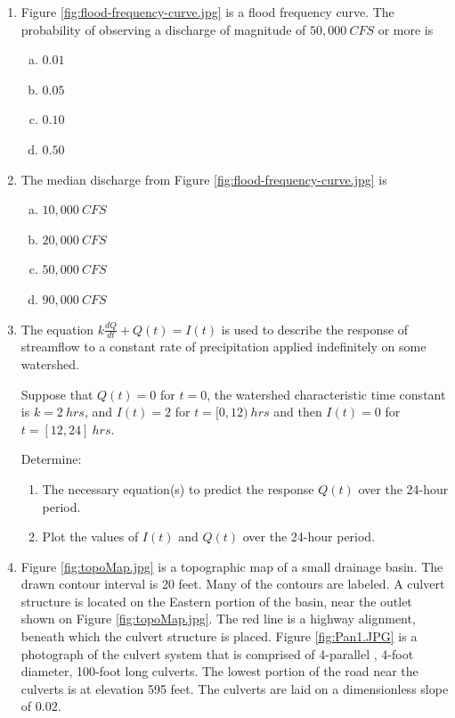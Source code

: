 \documentclass[12pt]{article}
\begin{document}
\begin{enumerate}
\item Figure \ref{fig:flood-frequency-curve.jpg} is a flood frequency curve.   The probability of observing a discharge of magnitude of $50,000~CFS$ or more is
\begin{enumerate}[(a)]
\item $0.01$
\item $0.05$
\item $0.10$
\item $0.50$
\end{enumerate}

\item The median discharge from Figure \ref{fig:flood-frequency-curve.jpg} is
\begin{enumerate}[(a)]
\item $10,000~CFS$
\item $20,000~CFS$
\item $50,000~CFS$
\item $90,000~CFS$
\end{enumerate}

\clearpage

\item The equation $k\frac{dQ}{dt} + Q(t) = I(t)$ is used to describe the response of streamflow to a constant rate of precipitation applied indefinitely on some watershed.  

Suppose that $Q(t)=0$ for $t=0$, the watershed characteristic time constant is $k=2~hrs$, and $I(t) =2$ for $t=[0,12)~hrs$ and then $I(t) =0$ for $t=[12,24]~hrs$. 

Determine:
\begin{enumerate}
\item The necessary equation(s) to predict the response $Q(t)$ over the 24-hour period.
\item Plot the values of $I(t)$ and $Q(t)$ over the 24-hour period.
\end{enumerate}
\clearpage

\item  Figure \ref{fig:topoMap.jpg} is a  topographic map of a small drainage basin.  The drawn contour interval is 20 feet.  Many of the contours are labeled.   A culvert structure is located on the Eastern portion of the basin, near the outlet shown on Figure \ref{fig:topoMap.jpg}.   The red line is a highway alignment, beneath which the culvert structure is placed.  Figure \ref{fig:Pan1.JPG} is a photograph of the culvert system that is comprised of 4-parallel , 4-foot diameter, 100-foot long culverts.  The lowest portion of the road near the culverts is at elevation 595 feet.  The culverts are laid on a dimensionless slope of $0.02$.


\end{enumerate}
\end{document}
